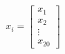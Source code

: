 \documentclass[preview]{standalone}
\begin{document}
\begin{align*}
x_i = \begin{bmatrix} x_1 \\ x_2 \\ \vdots \\ x_{20} \end{bmatrix}
\end{align*}
\end{document}
